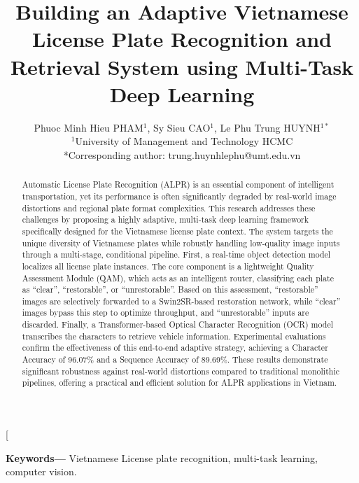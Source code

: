 \documentclass[a4paper,11pt,twocolumn]{article}
\title{\bfseries Building an Adaptive Vietnamese License Plate Recognition and Retrieval System using Multi-Task Deep Learning}
\author{
	Phuoc Minh Hieu PHAM$^{1}$, Sy Sieu CAO$^{1}$, Le Phu Trung HUYNH$^{1*}$\\
	$^{1}$University of Management and Technology HCMC\\[4pt]
	*Corresponding author: trung.huynhlephu@umt.edu.vn
}
\date{}
\begin{document}
	
	\twocolumn[
	\maketitle
	
	\renewcommand{\abstractname}{Abstract}
	
	\begin{abstract}
		Automatic License Plate Recognition (ALPR) is an essential component of intelligent transportation, yet its performance is often significantly degraded by real-world image distortions and regional plate format complexities. This research addresses these challenges by proposing a highly adaptive, multi-task deep learning framework specifically designed for the Vietnamese license plate context. The system targets the unique diversity of Vietnamese plates while robustly handling low-quality image inputs through a multi-stage, conditional pipeline. First, a real-time object detection model localizes all license plate instances. The core component is a lightweight Quality Assessment Module (QAM), which acts as an intelligent router, classifying each plate as ``clear'', ``restorable'', or ``unrestorable''. Based on this assessment, ``restorable'' images are selectively forwarded to a Swin2SR-based restoration network, while ``clear'' images bypass this step to optimize throughput, and ``unrestorable'' inputs are discarded. Finally, a Transformer-based Optical Character Recognition (OCR) model transcribes the characters to retrieve vehicle information. Experimental evaluations confirm the effectiveness of this end-to-end adaptive strategy, achieving a Character Accuracy of 96.07\% and a Sequence Accuracy of 89.69\%. These results demonstrate significant robustness against real-world distortions compared to traditional monolithic pipelines, offering a practical and efficient solution for ALPR applications in Vietnam.
	\end{abstract}
	
	\vspace{0.5em}
	\noindent\textbf{\small Keywords—} Vietnamese License plate recognition, multi-task learning, computer vision.
	
\end{document}
